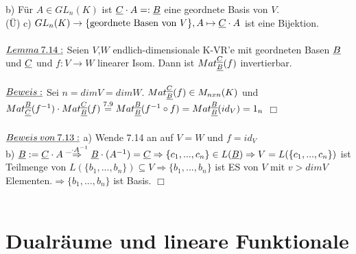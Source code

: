 \documentclass[fleqn, a4paper, 11pt]{scrartcl}
\theoremstyle{definition}
\begin{document}
b) Für $A\in GL_n(K)$ ist $\uline{C}\cdot A=:\uline{B}$ eine geordnete Basis von $V$.\\
(\"U) c) $GL_n(K)\rightarrow\{\text{geordnete Basen von }V\},A\mapsto\uline{C}\cdot A$ ist eine Bijektion.\\
\\
$\uline{Lemma\:7.14:}$ Seien $V$,$W$ endlich-dimensionale K-VR'e mit geordneten Basen $\uline{B}$ und $\uline{C}$ und $f:V\rightarrow W$ linearer Isom. Dann ist $Mat_{\uline{B}}^{\uline{C}}(f)$ invertierbar.\\
\\
$\uline{Beweis:}$ Sei $n=dim V=dim W$. $Mat_{\uline{B}}^{\uline{C}}(f)\in M_{nxn}(K)$ und $Mat_{\uline{C}}^{\uline{B}}(f^{-1})\cdot Mat_{\uline{B}}^{\uline{C}}(f)\stackrel{7.9}{=} Mat_{\uline{B}}^{\uline{B}}(f^{-1}\circ f)=Mat_{\uline{B}}^{\uline{B}}(id_V)=1_n$ \hfill $\Box$\\
\\
$\uline{Beweis\:von\:7.13:}$ a) Wende 7.14 an auf $V=W$ und $f=id_V$\\
b) $\uline{B}:=\uline{C}\cdot A\stackrel{\_\cdot A^{-1}}{\Rightarrow} \uline{B}\cdot (A^{-1})=\uline{C}\Rightarrow\{c_1,...,c_n\}\in L(\uline{B})\Rightarrow V=L(\{c_1,...,c_n\})$ ist Teilmenge von $L(\{b_1,...,b_n\})\subseteq V\Rightarrow \{b_1,...,b_n\}$ ist ES von $V$ mit $v> dim V$ Elementen.$\Rightarrow\{b_1,...,b_n\}$ ist Basis. \hfill $\Box$\\
\\
\newpage
\section{Dualräume und lineare Funktionale}
\end{document}
